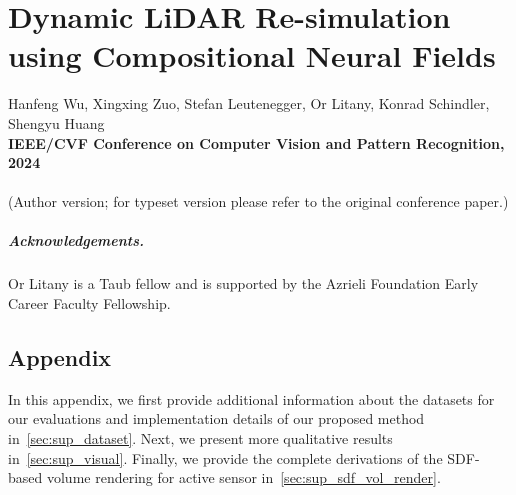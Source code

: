 \chapter[Dynamic LiDAR Re-simulation using Compositional Neural Fields]{Dynamic LiDAR Re-simulation using Compositional Neural Fields}
\label{chap:cvpr24}

Hanfeng Wu, Xingxing Zuo, Stefan Leutenegger, Or Litany, Konrad Schindler, Shengyu Huang \\
\textbf{IEEE/CVF Conference on Computer Vision and Pattern Recognition, 2024}\\
\\
(Author version; for typeset version please refer to the original conference paper.)\\

\providecommand{\subdir}{.}
\graphicspath{{\subdir/}}


\newpage









\paragraph{Acknowledgements.}
{Or Litany is a Taub fellow and is supported by the Azrieli Foundation Early Career Faculty Fellowship.}

\clearpage
\section{Appendix}
In this appendix, we first provide additional information about the datasets for our evaluations and implementation details of our proposed method in~\cref{sec:sup_dataset}. Next, we present more qualitative results in~\cref{sec:sup_visual}. Finally, we provide the complete derivations of the SDF-based volume rendering for active sensor in~\cref{sec:sup_sdf_vol_render}. 



\clearpage
